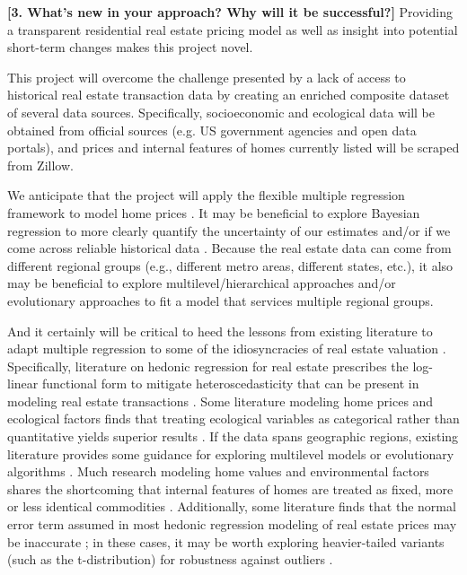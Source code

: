 \documentclass[sigconf,nonacm,11pt]{acmart}
\begin{document}
\textbf{[3. What's new in your approach? Why will it be successful?]}
Providing a transparent residential real estate pricing model \textendash as well as insight into potential short-term changes \textendash makes this project novel. 

This project will overcome the challenge presented by a lack of access to historical real estate transaction data by creating an enriched composite dataset of several data sources. Specifically, socioeconomic and ecological data will be obtained from official sources (e.g. US government agencies and open data portals), and prices and internal features of homes currently listed will be scraped from Zillow.

We anticipate that the project will apply the flexible multiple regression framework to model home prices \cite{James2014} \cite{James2014:LinearRegression}. It may be beneficial to explore Bayesian regression to more clearly quantify the uncertainty of our estimates and/or if we come across reliable historical data \cite{Gelman2014:BayesianLinReg}. Because the real estate data can come from different regional groups (e.g., different metro areas, different states, etc.), it also may be beneficial to explore multilevel/hierarchical approaches \cite{Gelman2007:MultilevelLinReg} \cite{Gelman2014:HierarchicalModels} \cite{Gelman2014:HierarchicalLinearModels} and/or evolutionary approaches \cite{Morano2019} to fit a model that services multiple regional groups.

And it certainly will be critical to heed the lessons from existing literature to adapt multiple regression to some of the idiosyncracies of real estate valuation \cite{Rosen1974} \cite{Ceh2018} \cite{Bin2004}. Specifically, literature on hedonic regression for real estate prescribes the log-linear functional form to mitigate heteroscedasticity that can be present in modeling real estate transactions \cite{Morano2019} \cite{Fletcher2000} \cite{Cassel1985}. Some literature modeling home prices and ecological factors finds that treating ecological variables as categorical rather than quantitative yields superior results \cite{Anselin2006}. If the data spans geographic regions, existing literature provides some guidance for exploring multilevel models \cite{Chen2017} or evolutionary algorithms \cite{Morano2019}. Much research modeling home values and environmental factors shares the shortcoming that internal features of homes are treated as fixed, more or less identical commodities \cite{Chen2017} \cite{Chen2019} \cite{Nestico2020} \cite{Bayer2009} \cite{Wang2021} \cite{Mei2020} \cite{Sun2020} \cite{Dai2020} \cite{Kim2003} \cite{Zheng2014}. Additionally, some literature finds that the normal error term assumed in most hedonic regression modeling of real estate prices may be inaccurate \cite{Francke2017}; in these cases, it may be worth exploring heavier-tailed variants (such as the t-distribution) for robustness against outliers \cite{Francke2017} \cite{Gelman2007:GLM}.
\end{document}
